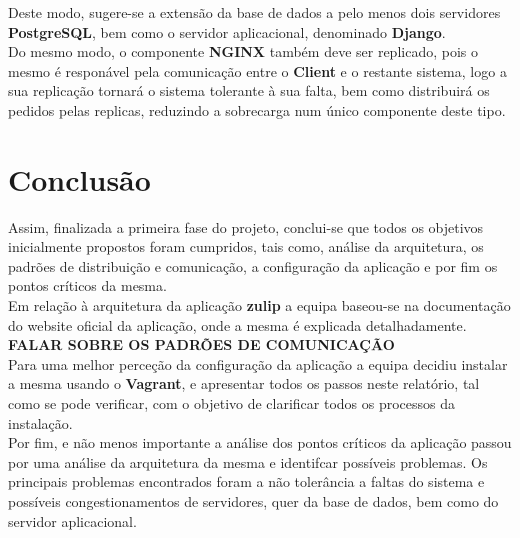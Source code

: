 \documentclass[11pt,a4paper]{report}%
\begin{document}
Deste modo, sugere-se a extensão da base de dados a pelo menos dois servidores \textbf{PostgreSQL}, bem como o servidor aplicacional, denominado \textbf{Django}. \\

Do mesmo modo, o componente \textbf{NGINX} também deve ser replicado, pois o mesmo é responável pela comunicação entre o \textbf{Client} e o restante sistema, logo a sua replicação tornará o sistema tolerante à sua falta, bem como distribuirá os pedidos pelas replicas, reduzindo a sobrecarga num único componente deste tipo.

\chapter{Conclusão}

Assim, finalizada a primeira fase do projeto, conclui-se que todos os objetivos inicialmente propostos foram cumpridos, tais como, análise da arquitetura, os padrões de distribuição e comunicação, a configuração da aplicação e por fim os pontos críticos da mesma.\\

Em relação à arquitetura da aplicação \textbf{zulip} a equipa baseou-se na documentação do website oficial da aplicação, onde a mesma é explicada detalhadamente. \\

\textbf{FALAR SOBRE OS PADRÕES DE COMUNICAÇÃO}\\

Para uma melhor perceção da configuração da aplicação a equipa decidiu instalar a mesma usando o \textbf{Vagrant}, e apresentar todos os passos neste relatório, tal como se pode verificar, com o objetivo de clarificar todos os processos da instalação. \\

Por fim, e não menos importante a análise dos pontos críticos da aplicação passou por uma análise da arquitetura da mesma e identifcar possíveis problemas. Os principais problemas encontrados foram a não tolerância a faltas do sistema e possíveis congestionamentos de servidores, quer da base de dados, bem como do servidor aplicacional.
\end{document}
